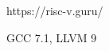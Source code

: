 
\begin{frame}{}
\end{frame}

\begin{frame}{}
	\begin{center}
		https://risc-v.guru/

		GCC 7.1, LLVM 9
	\end{center}
\end{frame}

